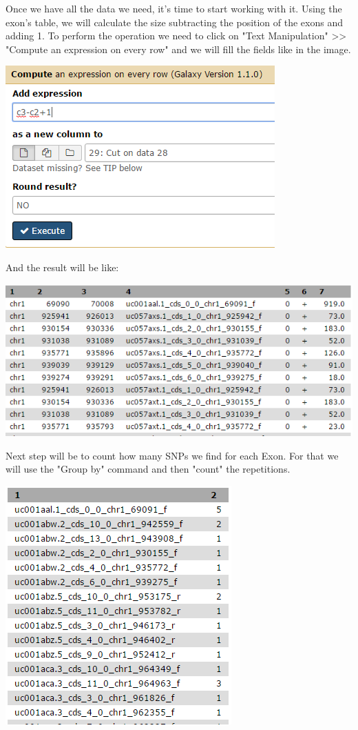 \documentclass[a4paper]{article}
\begin{document}
Once we have all the data we need, it's time to start working with it. Using the exon's table, we will calculate the size subtracting the position of the exons and adding 1.
To perform the operation we need to click on "Text Manipulation" >> "Compute an expression on every row" and we will fill the fields like in the image.\\

\centerline{\includegraphics[scale=0.5]{28_compute.PNG}}

And the result will be like: \\

\centerline{\includegraphics[scale=0.5]{28_table.PNG}}

Next step will be to count how many SNPs we find for each Exon. For that we will use the "Group by" command and then "count" the repetitions.\\

\centerline{\includegraphics[scale=0.5]{33_SNP_Exon.PNG}}
\end{document}
